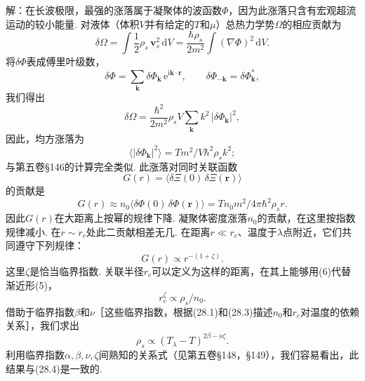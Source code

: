 \begin{xiti}
{\heiti 解：}在长波极限，最强的涨落属于凝聚体的波函数$\Phi$，因为此涨落只含有宏观超流运动的较小能量. 对液体（体积$V$并有给定的$T$和$\mu$）总热力学势$\Omega$的相应贡献为
\begin{equation*}
\delta\Omega=\int\frac{1}{2}\rho_{s}\,\bm{v}_{s}^{2}\,\mathrm{d}V=\frac{\hbar\rho_{s}}{2m^{2}}\int(\nabla\Phi)^{2}\,\mathrm{d}V.
\end{equation*}
将$\delta\Phi$表成傅里叶级数，
\begin{equation*}
\delta\Phi=\sum_{\bm{k}}\delta\Phi_{\bm{k}}\,\mathrm{e}^{\mathrm{i}\bm{k}\cdot\bm{r}},\qquad\delta\Phi_{-\bm{k}}=\delta\Phi^{*}_{\bm{k}},
\end{equation*}
我们得出
\begin{equation*}
\delta\Omega=\frac{\hbar^{2}}{2m^{2}}\rho_{s}V\sum_{\bm{k}}k^{2}\,|\delta\Phi_{\bm{k}}|^{2},
\end{equation*}
因此，均方涨落为
\begin{equation}\tag{4}
\bigl\langle|\delta\Phi_{\bm{k}}|^{2}\bigr\rangle=Tm^{2}/V\hbar^{2}\rho_{s}k^{2};
\end{equation}
与第五卷§146的计算完全类似. 此涨落对同时关联函数
\begin{equation*}
G(r)=\bigl\langle\delta\Xi(0)\,\delta\Xi(\bm{r})\bigr\rangle
\end{equation*}
的贡献是
\begin{equation}\tag{5}
G(r)\approx n_{0}\bigl\langle\delta\Phi(0)\,\delta\Phi(\bm{r})\bigr\rangle=Tn_{0}m^{2}/4\pi\hbar^{2}\rho_{s}r.
\end{equation}
因此$G(r)$在大距离上按幂的规律下降. 凝聚体密度涨落$n_{0}$的贡献，在这里按指数规律减小. 在$r\sim r_{c}$处此二贡献相差无几. 在距离$r\ll r_{c}$、温度于$\lambda$点附近，它们共同遵守下列规律：
\begin{equation}\tag{6}
G(r)\propto r^{-(1+\zeta)}.
\end{equation}
这里$\zeta$是恰当临界指数. 关联半径$r_{c}$可以定义为这样的距离，在其上能够用(6)代替渐近形(5)，
\begin{equation*}
r^{\zeta}_{c}\propto\rho_{s}/n_{0}.
\end{equation*}
借助于临界指数$\beta$和$\nu$［这些临界指数，根据(28.1)和(28.3)描述$n_{0}$和$r_{c}$对温度的依赖关系］，我们求出
\begin{equation*}
\rho_{s}\propto(T_{\lambda}-T)^{2\beta-\nu\zeta}.
\end{equation*}
利用临界指数$\alpha,\beta,\nu,\zeta$间熟知的关系式（见第五卷§148，§149），我们容易看出，此结果与(28.4)是一致的.

\end{xiti}

